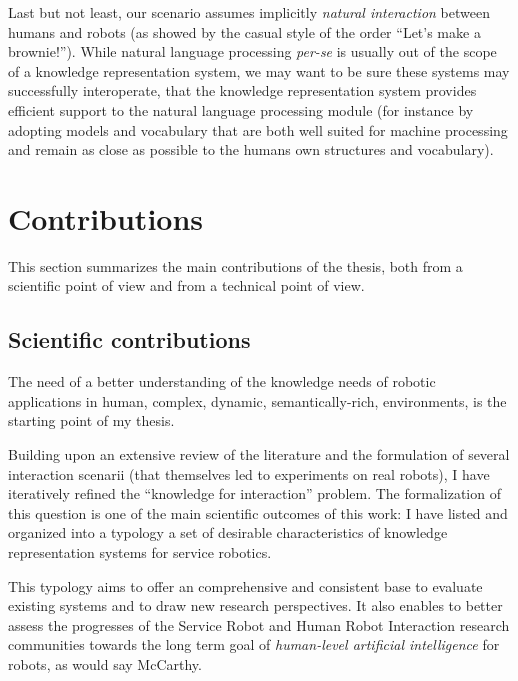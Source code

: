 Last but not least, our scenario assumes implicitly \emph{natural interaction}
between humans and robots (as showed by the casual style of the
order ``Let's make a brownie!''). While natural language processing {\it
per-se} is usually out of the scope of a knowledge representation system, we
may want to be sure these systems may successfully interoperate, \ie that the
knowledge representation system provides efficient support to the natural
language processing module (for instance by adopting models and vocabulary that
are both well suited for machine processing and remain as close as possible to
the humans own structures and vocabulary).



\section{Contributions}
\label{sect|contributions}

This section summarizes the main contributions of the thesis, both from a
scientific point of view and from a technical point of view.

\subsection{Scientific contributions}
\label{sect|scientific-contributions}

The need of a better understanding of the knowledge needs of robotic
applications in human, \ie complex, dynamic, semantically-rich, environments,
is the starting point of my thesis.

Building upon an extensive review of the literature and the formulation of
several interaction scenarii (that themselves led to experiments on real
robots), I have iteratively refined the ``knowledge for interaction'' problem.
The formalization of this question is one of the main scientific outcomes of
this work: I have listed and organized into a typology a set of desirable
characteristics of knowledge representation systems for service robotics.

This typology aims to offer an comprehensive and consistent base to evaluate
existing systems and to draw new research perspectives. It also enables to
better assess the progresses of the Service Robot and Human Robot Interaction
research communities towards the long term goal of \emph{human-level artificial
intelligence} for robots, as would say McCarthy.

